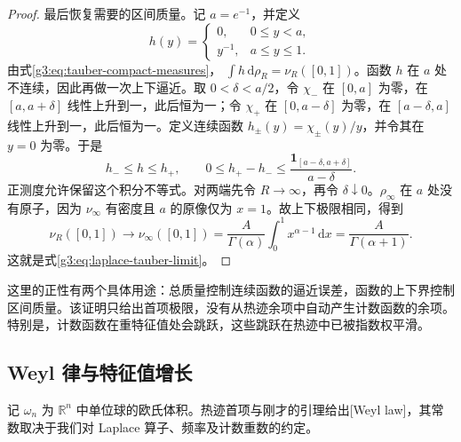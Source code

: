 \begin{proof}
	最后恢复需要的区间质量。记 \(a=e^{-1}\)，并定义
	\[
		h(y)=
		\begin{cases}
			0,&0\le y<a,\\
			y^{-1},&a\le y\le1.
		\end{cases}
	\]
	由式\eqref{g3:eq:tauber-compact-measures}，
	\(\int h\,\mathrm d\rho_R=\nu_R([0,1])\)。函数 \(h\) 在 \(a\) 处不连续，因此再做一次上下逼近。取 \(0<\delta<a/2\)，令 \(\chi_-\) 在 \([0,a]\) 为零，在 \([a,a+\delta]\) 线性上升到一，此后恒为一；令 \(\chi_+\) 在 \([0,a-\delta]\) 为零，在 \([a-\delta,a]\) 线性上升到一，此后恒为一。定义连续函数 \(h_\pm(y)=\chi_\pm(y)/y\)，并令其在 \(y=0\) 为零。于是
	\[
		h_-\le h\le h_+,\qquad
		0\le h_+-h_-\le
		\frac{\mathbf 1_{[a-\delta,a+\delta]}}{a-\delta}.
	\]
	正测度允许保留这个积分不等式。对两端先令 \(R\to\infty\)，再令 \(\delta\downarrow0\)。\(\rho_\infty\) 在 \(a\) 处没有原子，因为 \(\nu_\infty\) 有密度且 \(a\) 的原像仅为 \(x=1\)。故上下极限相同，得到
	\[
		\nu_R([0,1])\longrightarrow\nu_\infty([0,1])
		=\frac{A}{\Gamma(\alpha)}\int_0^1x^{\alpha-1}\,\mathrm dx
		=\frac{A}{\Gamma(\alpha+1)}.
	\]
	这就是式\eqref{g3:eq:laplace-tauber-limit}。
\end{proof}

这里的正性有两个具体用途：总质量控制连续函数的逼近误差，函数的上下界控制区间质量。该证明只给出首项极限，没有从热迹余项中自动产生计数函数的余项。特别是，计数函数在重特征值处会跳跃，这些跳跃在热迹中已被指数权平滑。

\subsection{Weyl 律与特征值增长}
\label{g3:subsec:1603:04}
记 \(\omega_n\) 为 \(\mathbb R^n\) 中单位球的欧氏体积。热迹首项与刚才的引理给出[Weyl law]，其常数取决于我们对 Laplace 算子、频率及计数重数的约定。

